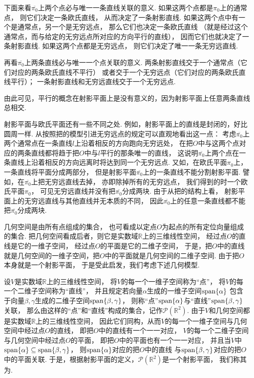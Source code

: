 下面来看\(\overline{\pi_0}\)上两个点必与唯一一条直线关联的意义.
如果这两个点都是\(\pi_0\)上的通常点，
则它们决定一条欧氏直线，
从而决定了一条射影直线.
如果这两个点中有一个是通常点，另一个是无穷远点，
那么它们也决定一条欧氏直线
（就是经过这个通常点，而与给定的无穷远点所对应的方向平行的直线），
因而它们也就决定了一条射影直线.
如果这两个点都是无穷远点，
则它们决定了唯一一条无穷远直线.

再看\(\overline{\pi_0}\)上两条直线必与唯一一个点关联的意义.
两条射影直线交于一个通常点（它们对应的两条欧氏直线不平行）
或者交于一个无穷远点（它们对应的两条欧氏直线平行）；
一条射影直线和无穷远直线交于一个无穷远点.

由此可见，平行的概念在射影平面上是没有意义的，因为射影平面上任意两条直线总相交.

射影平面与欧氏平面还有一些不同之处.
例如，射影平面上的直线是封闭的，好比圆周一样.
从按照把的模型引进无穷远点的规定可以直观地看出这一点：
考虑\(\overline{\pi_0}\)上两个通常点在一条直线\(l\)上沿着相反的方向跑向无穷远处，
在把\(O\)中与这两个点对应的两条直线都将趋于把\(O\)中与\(l\)平行的那条唯一的直线，
这说明\(\overline{\pi_0}\)上两个点在一条直线上沿着相反的方向远离时将达到同一个无穷远点.
又如，在欧氏平面\(\pi_0\)上，一条直线将平面分成两部分，
但是射影平面\(\overline{\pi_0}\)上的一条直线不能分割射影平面.
譬如，在\(\overline{\pi_0}\)上把无穷远直线去掉，
亦即除掉所有的无穷远点，
我们得到的时一个欧氏平面\(\pi_0\)，
可见无穷远直线并没有把\(\overline{\pi_0}\)分成两块.
由于从把的结构上看，
射影平面上的无穷远直线与其他直线并无本质的不同，
因此\(\overline{\pi_0}\)上的任意一条直线都不能把\(\overline{\pi_0}\)分成两块.

几何空间是由所有点组成的集合，
也可看成以定点\(O\)为起点的所有定位向量组成的集合.
把几何空间看成后者，则它是实数域\(\mathbb{R}\)上的三维线性空间，
经过点\(O\)的直线是它的一维子空间，
经过点\(O\)的平面是它的二维子空间，
于是，把\(O\)中的直线就是几何空间的一维子空间，把\(O\)中的平面就是几何空间的二维子空间.
由于把\(O\)本身就是一个射影平面，
于是受此启发，我们考虑下述几何模型.

设\(V\)是实数域\(\mathbb{R}\)上的三维线性空间，
将\(V\)的每一个一维子空间称为“点”，
将\(V\)的每一个二维子空间称为“直线”，
并且规定若向量\(\alpha\)生成的一维子空间\(\operatorname{span}\{\alpha\}\)
包含于向量\(\beta,\gamma\)生成的二维子空间\(\operatorname{span}\{\beta,\gamma\}\)，
则称“点”\(\operatorname{span}\{\alpha\}\)与“直线”\(\operatorname{span}\{\beta,\gamma\}\)关联，
那么由这样的“点”和“直线”构成的集合，记作\(\mathcal{P}(\mathbb{R}^2)\).
由于\(V\)和几何空间都是实数域\(\mathbb{R}\)上的三维线性空间，
因此它们同构，从而\(V\)的每一个一维子空间与几何空间中经过点\(O\)的直线，
即把\(O\)中的直线有一个一一对应，
\(V\)的每一个二维子空间与几何空间中经过点\(O\)的平面，
即把\(O\)中的平面也有一个一一对应，
并且当\(V\)中\(\operatorname{span}\{\alpha\} \subseteq \operatorname{span}\{\beta,\gamma\}\)，
则\(\operatorname{span}\{\alpha\}\)对应的把\(O\)中的直线
与\(\operatorname{span}\{\beta,\gamma\}\)对应的把\(O\)中的平面关联.
于是，根据射影平面的定义，\(\mathcal{P}(\mathbb{R}^2)\)是一个射影平面，
我们称其为.

